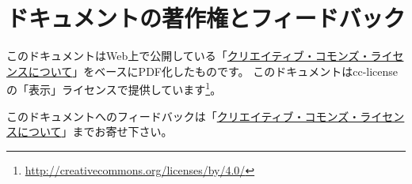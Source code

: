 \documentclass{ltjsarticle}
\begin{document}
\section*{ドキュメントの著作権とフィードバック}

このドキュメントはWeb上で公開している「\href{http://www.baldanders.info/cc-license.shtml#aboutCC}{クリエイティブ・コモンズ・ライセンスについて}」をベースにPDF化したものです。
このドキュメントはcc-licenseの「表示」ライセンスで提供しています\footnote{\url{http://creativecommons.org/licenses/by/4.0/}}。

このドキュメントへのフィードバックは「\href{http://www.baldanders.info/cc-license.shtml#aboutCC}{クリエイティブ・コモンズ・ライセンスについて}」までお寄せ下さい。
\end{document}
